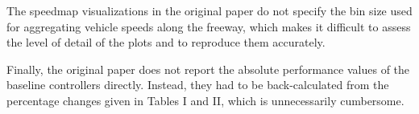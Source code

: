 \medskip
The speedmap visualizations in the original paper do not specify the bin size used for aggregating vehicle speeds along the freeway, which makes it difficult to assess the level of detail of the plots and to reproduce them accurately.

\medskip
Finally, the original paper does not report the absolute performance values of the baseline controllers directly. Instead, they had to be back-calculated from the percentage changes given in Tables I and II, which is unnecessarily cumbersome.
